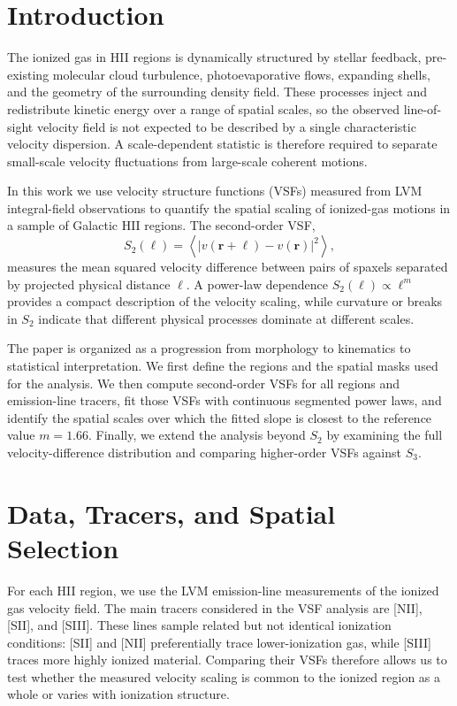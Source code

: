 \section{Introduction}
\label{sec:introduction}

The ionized gas in HII regions is dynamically structured by stellar feedback,
pre-existing molecular cloud turbulence, photoevaporative flows, expanding
shells, and the geometry of the surrounding density field. These processes
inject and redistribute kinetic energy over a range of spatial scales, so the
observed line-of-sight velocity field is not expected to be described by a
single characteristic velocity dispersion. A scale-dependent statistic is
therefore required to separate small-scale velocity fluctuations from
large-scale coherent motions.

In this work we use velocity structure functions (VSFs) measured from LVM
integral-field observations to quantify the spatial scaling of ionized-gas
motions in a sample of Galactic HII regions. The second-order VSF,
\begin{equation}
    S_2(\ell)
    =
    \left\langle
    \left| v(\mathbf{r}+\boldsymbol{\ell}) - v(\mathbf{r}) \right|^2
    \right\rangle ,
\end{equation}
measures the mean squared velocity difference between pairs of spaxels
separated by projected physical distance $\ell$. A power-law dependence
$S_2(\ell)\propto \ell^m$ provides a compact description of the velocity
scaling, while curvature or breaks in $S_2$ indicate that different physical
processes dominate at different scales.

The paper is organized as a progression from morphology to kinematics to
statistical interpretation. We first define the regions and the spatial masks
used for the analysis. We then compute second-order VSFs for all regions and
emission-line tracers, fit those VSFs with continuous segmented power laws, and
identify the spatial scales over which the fitted slope is closest to the
reference value $m=1.66$. Finally, we extend the analysis beyond $S_2$ by
examining the full velocity-difference distribution and comparing higher-order
VSFs against $S_3$.

\section{Data, Tracers, and Spatial Selection}
\label{sec:data-selection}

For each HII region, we use the LVM emission-line measurements of the ionized
gas velocity field. The main tracers considered in the VSF analysis are [NII],
[SII], and [SIII]. These lines sample related but not identical ionization
conditions: [SII] and [NII] preferentially trace lower-ionization gas, while
[SIII] traces more highly ionized material. Comparing their VSFs therefore
allows us to test whether the measured velocity scaling is common to the
ionized region as a whole or varies with ionization structure.

